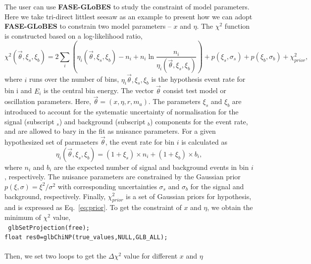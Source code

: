 \documentclass[a4paper,11pt]{article}
\begin{document}
The user can use \textbf{FASE-GLoBES} to study the constraint of model parameters. Here we take tri-direct littlest seesaw as an example to present how we can adopt \textbf{FASE-GLoBES} to constrain two model parameters -- $x$ and $\eta$. 
The $\chi^2$ function is constructed based on a log-likelihood ratio,
\begin{equation}\label{eq:chi-squared}
\chi^2(\vec{\theta},\xi_s,\xi_b)=2\sum_i\left(\eta_i(\vec{\theta},\xi_s,\xi_b)-n_i+n_i\ln\frac{n_i}{\eta_i(\vec{\theta},\xi_s,\xi_b)} \right)+p(\xi_s,\sigma_s)+p(\xi_b,\sigma_b)+\chi^2_{prior},
\end{equation}
where $i$ runs over the number of bins, $\eta_i{\vec{\theta},\xi_s,\xi_b}$ is the hypothesis event rate for bin i and $E_i$ is the central bin energy. The vector $\vec{\theta}$ consist test model or oscillation parameters. Here, $\vec{\theta}=(x,\eta,r,m_a)$. The parameters $\xi_s$ and $\xi_b$ are introduced to account for the systematic uncertainty of normalisation for the signal (subscript $_s$) and background (subscript $_b$) components for the event rate, and are allowed to bary in the fit as nuisance parameters. For a given hypothesized set of parmaeters $\vec{\theta}$, the event rate for bin $i$ is calculated as\\
\begin{equation}
\eta_i(\vec{\theta},\xi_s,\xi_b)=(1+\xi_s)\times n_i+(1+\xi_b)\times b_i,
\end{equation}
where $n_i$ and $b_i$ are the expected number of signal and background events in bin $i$, respectively. The nuisance parameters are constrained by the Gaussian prior $p(\xi,\sigma)=\xi^2/\sigma^2$ with corresponding uncertainties $\sigma_s$ and $\sigma_b$ for the signal and background, respectively. Finally, $\chi^2_{prior}$ is a set of Gaussian priors for hypothesis, and is expressed as Eq.~\ref{eq:prior}. 
To get the constraint of $x$ and $\eta$, we obtain the minimum of $\chi^2$ value,\vspace{0.2cm}\\
\texttt{
    glbSetProjection(free);\\
    float res0=glbChiNP(true\_values,NULL,GLB\_ALL);\\ } \vspace{0.2cm}\\
%
Then, we set two loops to get the $\Delta \chi^2$ value for different $x$ and $\eta$\vspace{0.2cm}\\
%
\end{document}
